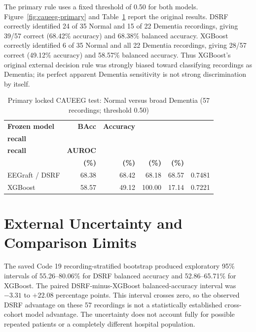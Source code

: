 The primary rule uses a fixed threshold of 0.50 for both models. Figure~\ref{fig:caueeg-primary} and Table~\ref{tab:caueeg-primary} report the original results. DSRF correctly identified 24 of 35 Normal and 15 of 22 Dementia recordings, giving 39/57 correct (68.42\% accuracy) and 68.38\% balanced accuracy. XGBoost correctly identified 6 of 35 Normal and all 22 Dementia recordings, giving 28/57 correct (49.12\% accuracy) and 58.57\% balanced accuracy. Thus XGBoost's original external decision rule was strongly biased toward classifying recordings as Dementia; its perfect apparent Dementia sensitivity is not strong discrimination by itself.

\begin{table}[!htbp]\centering\footnotesize
\caption{Primary locked CAUEEG test: Normal versus broad Dementia (57 recordings; threshold 0.50)}\label{tab:caueeg-primary}
\begin{tabularx}{\textwidth}{@{}Xrrrrr@{}}\toprule
\textbf{Frozen model}&\textbf{BAcc}&\textbf{Accuracy}&\shortstack{\textbf{Dementia}\\\textbf{recall}}&\shortstack{\textbf{Normal}\\\textbf{recall}}&\textbf{AUROC}\\
&\textbf{(\%)}&\textbf{(\%)}&\textbf{(\%)}&\textbf{(\%)}&\\\midrule
EEGraft / DSRF&68.38&68.42&68.18&68.57&0.7481\\
XGBoost&58.57&49.12&100.00&17.14&0.7221\\\bottomrule
\end{tabularx}\end{table}


\section{External Uncertainty and Comparison Limits}
The saved Code 19 recording-stratified bootstrap produced exploratory 95\% intervals of 55.26--80.06\% for DSRF balanced accuracy and 52.86--65.71\% for XGBoost. The paired DSRF-minus-XGBoost balanced-accuracy interval was $-3.31$ to $+22.08$ percentage points. This interval crosses zero, so the observed DSRF advantage on these 57 recordings is not a statistically established cross-cohort model advantage. The uncertainty does not account fully for possible repeated patients or a completely different hospital population.

